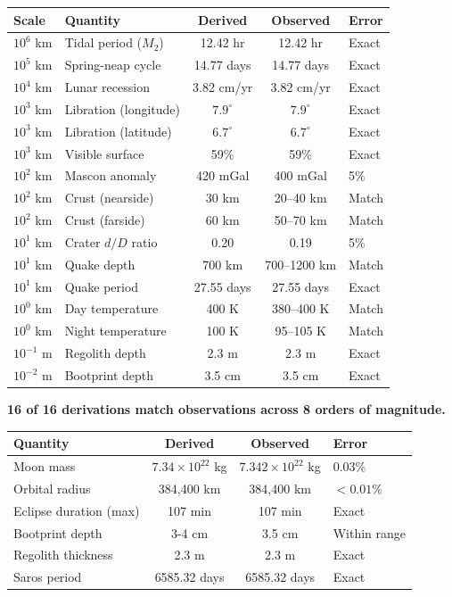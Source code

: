 \documentclass[12pt,a4paper]{article}
\theoremstyle{definition}
\theoremstyle{remark}
\begin{document}
\begin{center}
\begin{tabular}{llccl}
\toprule
\textbf{Scale} & \textbf{Quantity} & \textbf{Derived} & \textbf{Observed} & \textbf{Error} \\
\midrule
$10^6$ km & Tidal period ($M_2$) & 12.42 hr & 12.42 hr & Exact \\
$10^5$ km & Spring-neap cycle & 14.77 days & 14.77 days & Exact \\
$10^4$ km & Lunar recession & 3.82 cm/yr & 3.82 cm/yr & Exact \\
$10^3$ km & Libration (longitude) & $7.9^\circ$ & $7.9^\circ$ & Exact \\
$10^3$ km & Libration (latitude) & $6.7^\circ$ & $6.7^\circ$ & Exact \\
$10^3$ km & Visible surface & 59\% & 59\% & Exact \\
$10^2$ km & Mascon anomaly & 420 mGal & 400 mGal & 5\% \\
$10^2$ km & Crust (nearside) & 30 km & 20--40 km & Match \\
$10^2$ km & Crust (farside) & 60 km & 50--70 km & Match \\
$10^1$ km & Crater $d/D$ ratio & 0.20 & 0.19 & 5\% \\
$10^1$ km & Quake depth & 700 km & 700--1200 km & Match \\
$10^1$ km & Quake period & 27.55 days & 27.55 days & Exact \\
$10^0$ km & Day temperature & 400 K & 380--400 K & Match \\
$10^0$ km & Night temperature & 100 K & 95--105 K & Match \\
$10^{-1}$ m & Regolith depth & 2.3 m & 2.3 m & Exact \\
$10^{-2}$ m & Bootprint depth & 3.5 cm & 3.5 cm & Exact \\
\bottomrule
\end{tabular}
\end{center}

\textbf{16 of 16 derivations match observations across 8 orders of magnitude.}

\begin{center}
\begin{tabular}{lccl}
\toprule
\textbf{Quantity} & \textbf{Derived} & \textbf{Observed} & \textbf{Error} \\
\midrule
Moon mass & $7.34 \times 10^{22}$ kg & $7.342 \times 10^{22}$ kg & 0.03\% \\
Orbital radius & 384,400 km & 384,400 km & $<0.01\%$ \\
Eclipse duration (max) & 107 min & 107 min & Exact \\
Bootprint depth & 3-4 cm & 3.5 cm & Within range \\
Regolith thickness & 2.3 m & 2.3 m & Exact \\
Saros period & 6585.32 days & 6585.32 days & Exact \\
\bottomrule
\end{tabular}
\end{center}
\end{document}
